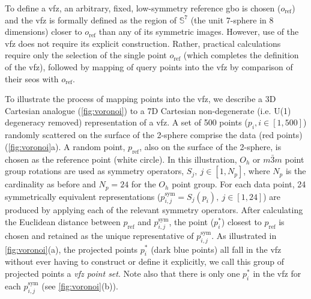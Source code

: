 \documentclass[final,twocolumn,12pt]{elsarticle}
\newcommand{\startpt}{red points}
\newcommand{\refpt}{white circle}
\begin{document}
To define a \gls{vfz}, an arbitrary, fixed, low-symmetry reference \gls{gbo} is chosen ($o_{\text{ref}}$) and the \gls{vfz} is formally defined as the region of $\mathbb{S}^7$ (the unit 7-sphere in 8 dimensions) closer to $o_{\text{ref}}$ than any of its symmetric images. However, use of the \gls{vfz} does not require its explicit construction. Rather, practical calculations require only the selection of the single point $o_{\text{ref}}$ (which completes the definition of the \gls{vfz}), followed by mapping of query points into the \gls{vfz} by comparison of their \glspl{seo} with $o_{\text{ref}}$.

To illustrate the process of mapping points into the \gls{vfz}, we describe a 3D Cartesian analogue (\cref{fig:voronoi}) to a 7D Cartesian non-degenerate (i.e. U(1) degeneracy removed) representation of a \gls{vfz}. A set of \num{500} points ($p_i, i\in[1,500]$) randomly scattered on the surface of the 2-sphere comprise the data (\startpt{}) (\cref{fig:voronoi}a). A random point, $p_{\text{ref}}$, also on the surface of the 2-sphere, is chosen as the reference point (\refpt{}). In this illustration, $O_h$ or $m\bar{3}m$ point group rotations are used as symmetry operators, $S_j,\ j\in[1,N_p]$, where $N_p$ is the cardinality as before and $N_p = 24$ for the $O_h$  point group. For each data point, \num{24} symmetrically equivalent representations ($p^{\text{sym}}_{i,j} = S_j(p_i),\ j\in[1,24]$) are produced by applying each of the relevant symmetry operators. After calculating the Euclidean distance between $p_{\text{ref}}$ and $p^{\text{sym}}_{i,j}$, the point ($p^{*}_i$) closest to $p_{\text{ref}}$ is chosen and retained as the unique representative of $p^{\text{sym}}_{i,j}$. As illustrated in \cref{fig:voronoi}(a), the projected points $p^{*}_i$ (dark blue points) all fall in the \gls{vfz} without ever having to construct or define it explicitly, we call this group of projected points a \textit{\gls{vfz} point set}. Note also that there is only one $p^{*}_i$ in the \gls{vfz} for each $p^{\text{sym}}_{i,j}$ (see \cref{fig:voronoi}(b)).
\end{document}
